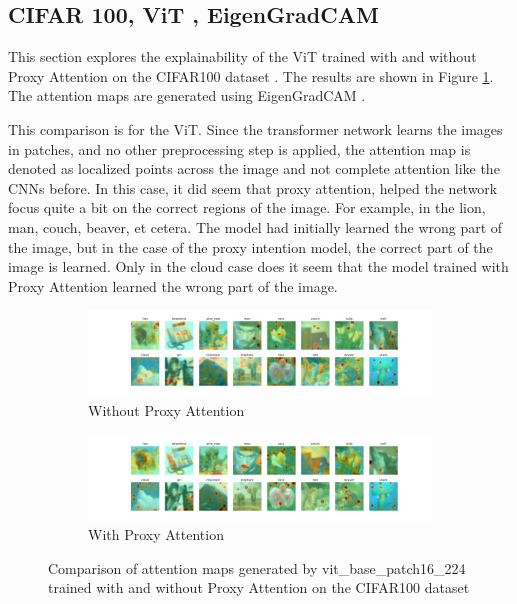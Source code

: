 \documentclass[a4paper,11pt,openright]{book}
\begin{document}
\subsection{CIFAR 100, ViT , EigenGradCAM}
This section explores the explainability of the ViT \cite{dosovitskiyImageWorth16x162021} trained with and without Proxy Attention on the CIFAR100 dataset \cite{krizhevskyLearningMultipleLayers}. The results are shown in Figure \ref{fig:vit_cifar100}. The attention maps are generated using EigenGradCAM \cite{banymuhammadEigenCAMVisualExplanations2021}.

This comparison is for the ViT. Since the transformer network learns the images in patches, and no other preprocessing step is applied, the attention map is denoted as localized points across the image and not complete attention like the CNNs before. In this case, it did seem that proxy attention, helped the network focus quite a bit on the correct regions of the image. For example, in the lion, man, couch, beaver, et cetera. The model had initially learned the wrong part of the image, but in the case of the proxy intention model, the correct part of the image is learned. Only in the cloud case does it seem that the model trained with Proxy Attention learned the wrong part of the image.

    \begin{figure}[!htb]
        \begin{subfigure}[b]{1\textwidth}
            \includegraphics[width=\linewidth]{images/gpp_cifar100_vit_base_patch16_224_noproxy_0.pdf}
            \caption{Without Proxy Attention}
        \end{subfigure}
        \begin{subfigure}[b]{1\textwidth}
            \includegraphics[width=\linewidth]{images/gpp_cifar100_vit_base_patch16_224_proxy_0.pdf}
            \caption{With Proxy Attention}
        \end{subfigure}
        \caption{Comparison of attention maps generated by vit\_base\_patch16\_224 trained with and without Proxy Attention on the CIFAR100 dataset}
        \label{fig:vit_cifar100}
    \end{figure}
    
\end{document}
